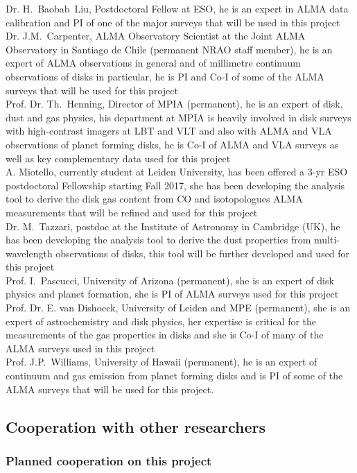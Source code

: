 \documentclass[10pt,fleqn,twoside]{article}
\begin{document}
Dr. H.~Baobab~Liu, Postdoctoral Fellow at ESO, he is an expert in ALMA data calibration and PI of one of the major surveys that will be used in this project\\
Dr. J.M.~Carpenter, ALMA Observatory Scientist at the Joint ALMA Observatory in Santiago de Chile (permanent NRAO staff member), he is an expert of ALMA observations in general and of millimetre continuum observations of disks in particular, he is PI and Co-I of some of the ALMA surveys that will be used for this project\\
Prof. Dr. Th.~Henning, Director of MPIA (permanent), he is an expert of disk, dust and gas physics, his department at MPIA is heavily involved in disk surveys with high-contrast imagers at LBT and VLT and also with ALMA and VLA observations of planet forming disks, he is Co-I of ALMA and VLA surveys as well as key complementary data used for this project\\
A. Miotello, currently student at Leiden University, has been offered a 3-yr ESO postdoctoral Fellowship starting Fall 2017, she has been developing the analysis tool to derive the disk gas content from CO and isotopologues ALMA measurements that will be refined and used for this project\\
Dr. M.~Tazzari, postdoc at the Institute of Astronomy in Cambridge (UK), he has been developing the analysis tool to derive the dust properties from multi-wavelength observations of disks, this tool will be further developed and used for this project\\
Prof. I.~Pascucci, University of Arizona (permanent), she is an expert of disk physics and planet formation, she is PI of ALMA surveys used for this project\\
Prof. Dr. E. van Dishoeck, University of Leiden and MPE (permanent), she is an expert of astrochemistry and disk physics, her expertise is critical for the measurements of the gas properties in disks and she is Co-I of many of the ALMA surveys used in this project\\
Prof. J.P.~Williams, University of Hawaii (permanent), he is an expert of continuum and gas emission from planet forming disks and is PI of some of the ALMA surveys that will be used for this project.

\subsection{Cooperation with other researchers}

\subsubsection{Planned cooperation on this project}
\end{document}
